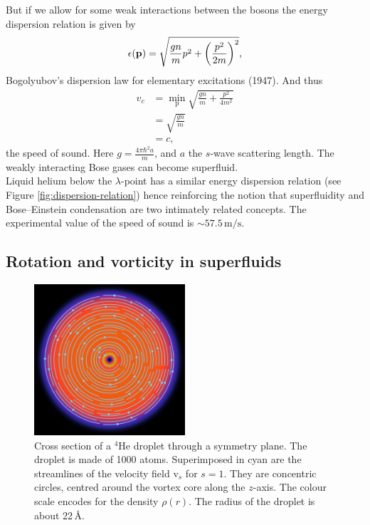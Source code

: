 \documentclass[12pt,a4paper,twosides]{book}
\renewcommand{\vec}[1]{\bm{\mathrm{#1}}}
\newcommand{\unit}[1]{\,\mathrm{#1}}
\begin{document}
			But if we allow for some weak interactions between the bosons the energy dispersion relation is given by
			\begin{align}
				\epsilon(\vec{p})=\sqrt{\frac{gn}{m}p^2+\qty(\frac{p^2}{2m})^2},
			\end{align}
			Bogolyubov's dispersion law for elementary excitations (1947). And thus
			\begin{align}
				v_c &=\min_{\vec{p}}\sqrt{\frac{gn}{m}+\frac{p^2}{4m^2}} \\
					&= \sqrt{\frac{gn}{m}} \\
					&= c,
			\end{align}
			the speed of sound. Here $g=\frac{4\pi\hbar^2a}{m}$, and $a$ the $s$-wave scattering length. The weakly interacting Bose gases can become superfluid.\\			

			Liquid helium below the $\lambda$-point has a similar energy dispersion relation (see Figure \ref{fig:dispersion-relation}) hence reinforcing the notion that superfluidity and Bose--Einstein condensation are two intimately related concepts. The experimental value of the speed of sound is $\sim\!57.5\unit{m/s}$.
			
		\subsection{Rotation and vorticity in superfluids}\label{sec:rot-vort}
			\begin{figure}[t]
				\begin{center}
					\includegraphics[width=0.5\textwidth]{vortex-xy}
					\caption{Cross section of a $^4$He droplet through a symmetry plane. The droplet is made of 1000 atoms. Superimposed in cyan are the streamlines of the velocity field $\vec{v}_s$ for $s=1$. They are concentric circles, centred around the vortex core along the $z$-axis. The colour scale encodes for the density $\rho(r)$. The radius of the droplet is about 22\,\AA.}
					\label{fig:vortex-xy}
				\end{center}
			\end{figure}
		
\end{document}
